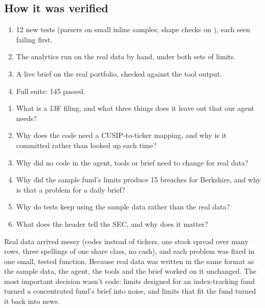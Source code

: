 \documentclass[11pt]{article}
\newcommand{\code}[1]{\texttt{\detokenize{#1}}}
\begin{document}
\subsection{How it was verified}

\begin{enumerate}
  \item 12 new tests (parsers on small inline samples; shape checks on \code{data/real/}),
        each seen failing first.
  \item The analytics run on the real data by hand, under both sets of limits.
  \item A live brief on the real portfolio, checked against the tool output.
  \item Full suite: 145 passed.
\end{enumerate}

\begin{reviewq}
\begin{enumerate}
  \item What is a 13F filing, and what three things does it leave out that our agent needs?
  \item Why does the code need a CUSIP-to-ticker mapping, and why is it committed rather than
        looked up each time?
  \item Why did no code in the agent, tools or brief need to change for real data?
  \item Why did the sample fund's limits produce 15 breaches for Berkshire, and why is that a
        problem for a daily brief?
  \item Why do tests keep using the sample data rather than the real data?
  \item What does the \code{User-Agent} header tell the SEC, and why does it matter?
\end{enumerate}
\end{reviewq}

\begin{takeaway}
Real data arrived messy (codes instead of tickers, one stock spread over many rows, three
spellings of one share class, no cash), and each problem was fixed in one small, tested
function. Because real data was written in the same format as the sample data, the agent, the
tools and the brief worked on it unchanged. The most important decision wasn't code: limits
designed for an index-tracking fund turned a concentrated fund's brief into noise, and limits
that fit the fund turned it back into news.
\end{takeaway}
\end{document}
